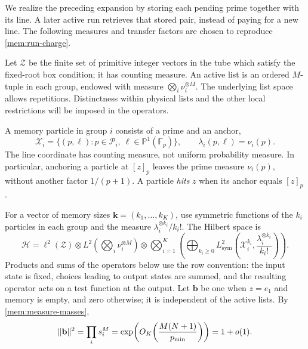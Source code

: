 We realize the preceding expansion by storing each pending prime
together with its line. A later active run retrieves that stored pair,
instead of paying for a new line. The following measures and transfer
factors are chosen to reproduce \eqref{mem:run-charge}.

Let $\mathcal Z$ be the finite set of primitive integer vectors in the
tube which satisfy the fixed-root box condition; it has counting
measure. An active list is an ordered $M$-tuple in each group, endowed
with measure $\bigotimes_i\nu_i^{\otimes M}$. The underlying list space
allows repetitions. Distinctness within physical lists and the other
local restrictions will be imposed in the operators.

A memory particle in group $i$ consists of a prime and an anchor,
\begin{equation}\label{mem:particle-space}
 \mathcal X_i=\{(p,\ell):p\in\mathcal P_i,
                 \ \ell\in\mathbb P^1(\mathbb F_p)\},\qquad
 \lambda_i(p,\ell)=\nu_i(p).
\end{equation}
The line coordinate has counting measure, not uniform probability
measure. In particular, anchoring a particle at $[z]_p$ leaves the
prime measure $\nu_i(p)$, without another factor $1/(p+1)$. A particle
\emph{hits} $z$ when its anchor equals $[z]_p$.

For a vector of memory sizes $\boldsymbol k=(k_1,\ldots,k_K)$,
use symmetric functions of the $k_i$ particles in each group and the
measure $\lambda_i^{\otimes k_i}/k_i!$. The Hilbert space is
\begin{equation}\label{mem:hilbert-space}
 \mathscr H=
 \ell^2(\mathcal Z)\otimes
 L^2\!\left(\bigotimes_i\nu_i^{\otimes M}\right)
 \otimes\bigotimes_{i=1}^K
 \left(\bigoplus_{k_i\ge0}
 L^2_{\mathrm{sym}}\!\left(\mathcal X_i^{k_i},
                   \frac{\lambda_i^{\otimes k_i}}{k_i!}\right)\right).
\end{equation}
Products and sums of the operators below use the row convention:
the input state is fixed, choices leading to output states are summed,
and the resulting operator acts on a test function at the output.
Let $\mathbf b$ be one when $z=e_1$ and memory is empty, and zero
otherwise; it is independent of the active lists. By
\eqref{mem:measure-masses},
\begin{equation}\label{mem:boundary-norm}
 \lVert\mathbf b\rVert^2=\prod_i s_i^M
   =\exp\!\left(O_K\!\left(\frac{M(N+1)}{p_{\min}}\right)\right)
   =1+o(1).
\end{equation}

